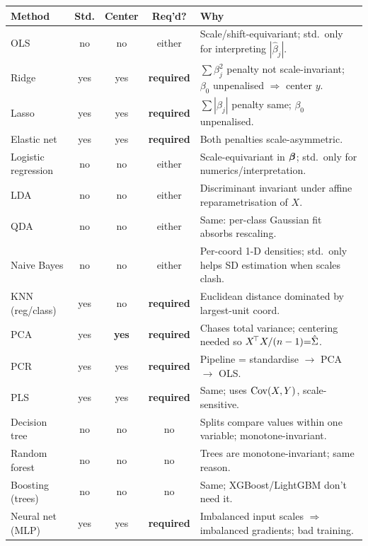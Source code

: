 \scriptsize
\begin{tabularx}{\linewidth}{@{}l c c c X@{}}
\toprule
\textbf{Method} & \textbf{Std.} & \textbf{Center} & \textbf{Req'd?} & \textbf{Why} \\
\midrule
OLS                   & no  & no  & either & Scale/shift-equivariant; std.\ only for interpreting $|\hat\beta_j|$. \\
Ridge                 & yes & yes & \textbf{required} & $\sum\beta_j^2$ penalty not scale-invariant; $\beta_0$ unpenalised $\Rightarrow$ center $y$. \\
Lasso                 & yes & yes & \textbf{required} & $\sum|\beta_j|$ penalty same; $\beta_0$ unpenalised. \\
Elastic net           & yes & yes & \textbf{required} & Both penalties scale-asymmetric. \\
Logistic regression   & no  & no  & either & Scale-equivariant in $\bm{\beta}$; std.\ only for numerics/interpretation. \\
LDA                   & no  & no  & either & Discriminant invariant under affine reparametrisation of $X$. \\
QDA                   & no  & no  & either & Same: per-class Gaussian fit absorbs rescaling. \\
Naive Bayes           & no  & no  & either & Per-coord 1-D densities; std.\ only helps SD estimation when scales clash. \\
KNN (reg/class)       & yes & no  & \textbf{required} & Euclidean distance dominated by largest-unit coord. \\
PCA                   & yes & \textbf{yes} & \textbf{required} & Chases total variance; centering needed so $X^{\!\top} X/(n-1){=}\hat\Sigma$. \\
PCR                   & yes & yes & \textbf{required} & Pipeline = standardise $\to$ PCA $\to$ OLS. \\
PLS                   & yes & yes & \textbf{required} & Same; uses $\operatorname{Cov}(X,Y)$, scale-sensitive. \\
Decision tree         & no  & no  & no & Splits compare values within one variable; monotone-invariant. \\
Random forest         & no  & no  & no & Trees are monotone-invariant; same reason. \\
Boosting (trees)      & no  & no  & no & Same; XGBoost/LightGBM don't need it. \\
Neural net (MLP)      & yes & yes & \textbf{required} & Imbalanced input scales $\Rightarrow$ imbalanced gradients; bad training. \\

\end{tabularx}
